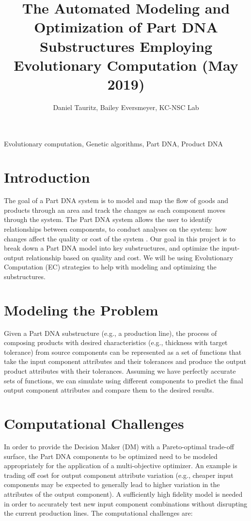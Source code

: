 \documentclass{IEEEtran}
\begin{document}
\title{The Automated Modeling and Optimization of Part DNA Substructures Employing Evolutionary Computation (May 2019)}
\author{Daniel Tauritz, Bailey Eversmeyer, KC-NSC Lab}

\maketitle

\begin{abstract}

\end{abstract}

\begin{IEEEkeywords}
Evolutionary computation, Genetic algorithms, Part DNA, Product DNA
\end{IEEEkeywords}

\section{Introduction}
The goal of a Part DNA system is to model and map the flow of goods and products through an area and track the changes as each component moves through the system. The Part DNA system allows the user to identify relationships between components, to conduct analyses on the system: how changes affect the quality or cost of the system \cite{b1}. Our goal in this project is to break down a Part DNA model into key substructures, and optimize the input-output relationship based on quality and cost. We will be using Evolutionary Computation (EC) strategies to help with modeling and optimizing the substructures.

\section{Modeling the Problem}
Given a Part DNA substructure (e.g., a production line), the process of composing products with desired characteristics (e.g., thickness with target tolerance) from source components can be represented as a set of functions that take the input component attributes and their tolerances and produce the output product attributes with their tolerances. Assuming we have perfectly accurate sets of functions, we can simulate using different components to predict the final output component attributes and compare them to the desired results.

\section{Computational Challenges}
In order to provide the Decision Maker (DM) with a Pareto-optimal trade-off surface, the Part DNA components to be optimized need to be modeled appropriately for the application of a multi-objective optimizer. An example is trading off cost for output component attribute variation (e.g., cheaper input components may be expected to generally lead to higher variation in the attributes of the output component). A sufficiently high fidelity model is needed in order to accurately test new input component combinations without disrupting the current production lines. The computational challenges are:
\end{document}
